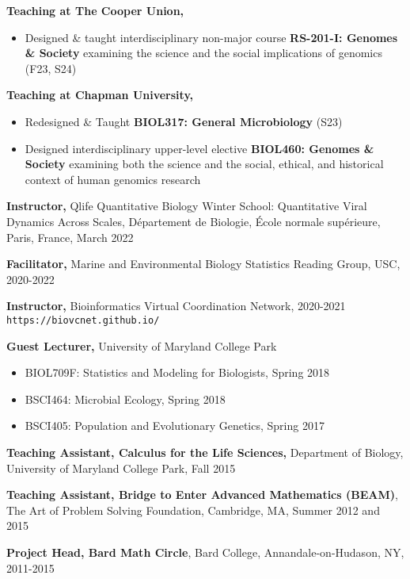 \documentclass[]{res}
\begin{document}
\begin{resume}
{\bf Teaching at The Cooper Union,} 
\begin{itemize} \itemsep -2pt
\item Designed \& taught interdisciplinary non-major course {\bf RS-201-I: Genomes \& Society} examining the science and the social implications of genomics (F23, S24)
\end{itemize}

{\bf Teaching at Chapman University,} 
\begin{itemize} \itemsep -2pt
\item Redesigned \& Taught {\bf BIOL317: General Microbiology} (S23)
\item Designed interdisciplinary upper-level elective {\bf BIOL460: Genomes \& Society} examining both the science and the social, ethical, and historical context of human genomics research
\end{itemize}

{\bf Instructor,} Qlife Quantitative Biology Winter School: Quantitative Viral Dynamics Across Scales, D\'{e}partement de Biologie, \'{E}cole normale sup\'{e}rieure, Paris, France, March 2022

{\bf Facilitator,} {Marine and Environmental Biology Statistics Reading Group}, USC, 2020-2022

{\bf Instructor,} Bioinformatics Virtual Coordination Network, 2020-2021\\
\verb|https://biovcnet.github.io/|

{\bf Guest Lecturer,} University of Maryland College Park
\begin{itemize} \itemsep -2pt
\item BIOL709F: Statistics and Modeling for Biologists, Spring 2018
\item BSCI464: Microbial Ecology, Spring 2018 
\item BSCI405: Population and Evolutionary Genetics, Spring 2017
\end{itemize}

{\bf Teaching Assistant, Calculus for the Life Sciences,} Department of Biology, University of Maryland College Park, Fall 2015%

{\bf Teaching Assistant, Bridge to Enter Advanced Mathematics (BEAM)}, The Art of Problem Solving Foundation, Cambridge, MA, Summer 2012 and 2015 %

{\bf Project Head, Bard Math Circle}, Bard College, Annandale-on-Hudason, NY, 2011-2015


\end{resume}
\end{document}
